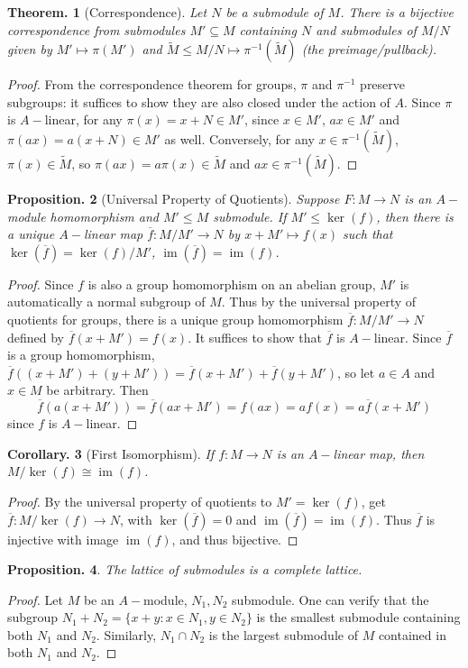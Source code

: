 \documentclass[11pt, a4paper]{memoir}
\theoremstyle{change}
\newtheorem{theorem}{Theorem.}[section]
\newtheorem{corollary}[theorem]{Corollary.}
\newtheorem{proposition}[theorem]{Proposition.}
\theoremstyle{plain}
\theoremstyle{nonumberplain}
\newtheorem{proof}{Proof}
\DeclareMathOperator{\im}{im}
\numberwithin{equation}{section}
\begin{document}
\begin{theorem}[Correspondence]
    Let $N$ be a submodule of $M$.
    There is a bijective correspondence from submodules $M'\subseteq M$ containing $N$ and submodules of $M/N$ given by $M'\mapsto\pi(M')$ and $\tilde M\leq M/N\mapsto \pi^{-1}(\tilde M)$ (the preimage/pullback).
\end{theorem}
\begin{proof}
    From the correspondence theorem for groups, $\pi$ and $\pi^{-1}$ preserve subgroups: it suffices to show they are also closed under the action of $A$.
    Since $\pi$ is $A-$linear, for any $\pi(x)=x+N\in M'$, since $x\in M'$, $ax\in M'$ and $\pi(ax)=a(x+N)\in M'$ as well.
    Conversely, for any $x\in\pi^{-1}(\tilde M)$, $\pi(x)\in\tilde M$, so $\pi(ax)=a\pi(x)\in\tilde M$ and $ax\in\pi^{-1}(\tilde M)$.
\end{proof}
\begin{proposition}[Universal Property of Quotients]
    Suppose $F:M\to N$ is an $A-$module homomorphism and $M'\leq M$ submodule.
    If $M'\leq\ker(f)$, then there is a unique $A-$linear map $\overline{f}:M/M'\to N$ by $x+M'\mapsto f(x)$ such that $\ker(\overline{f})=\ker(f)/M'$, $\im(\overline{f})=\im(f)$.
\end{proposition}
\begin{proof}
    Since $f$ is also a group homomorphism on an abelian group, $M'$ is automatically a normal subgroup of $M$.
    Thus by the universal property of quotients for groups, there is a unique group homomorphism $\overline{f}:M/M'\to N$ defined by $\overline{f}(x+M')=f(x)$.
    It suffices to show that $\overline{f}$ is $A-$linear.
    Since $\overline{f}$ is a group homomorphism, $\overline{f}( (x+M')+(y+M'))=\overline{f}(x+M')+\overline{f}(y+M')$, so let $a\in A$ and $x\in M$ be arbitrary.
    Then
    \begin{equation*}
        \overline{f}(a(x+M'))=\overline{f}(ax+M')=f(ax)=af(x)=a\overline{f}(x+M')
    \end{equation*}
    since $f$ is $A-$linear.
\end{proof}
\begin{corollary}[First Isomorphism]
    If $f:M\to N$ is an $A-$linear map, then $M/\ker(f)\cong\im(f)$.
\end{corollary}
\begin{proof}
    By the universal property of quotients to $M'=\ker(f)$, get $\overline{f}:M/\ker(f)\to N$, with $\ker(\overline{f})=0$ and $\im(\overline{f})=\im(f)$.
    Thus $\overline{f}$ is injective with image $\im(f)$, and thus bijective.
\end{proof}
\begin{proposition}
    The lattice of submodules is a complete lattice.
\end{proposition}
\begin{proof}
    Let $M$ be an $A-$module, $N_1,N_2$ submodule.
    One can verify that the subgroup $N_1+N_2=\{x+y:x\in N_1,y\in N_2\}$ is the smallest submodule containing both $N_1$ and $N_2$.
    Similarly, $N_1\cap N_2$ is the largest submodule of $M$ contained in both $N_1$ and $N_2$.
\end{proof}
\end{document}

